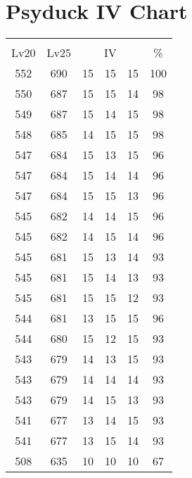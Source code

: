 \documentclass{article}%
\begin{document}
%
\normalsize%
\section{Psyduck IV Chart}%
\label{sec:Psyduck IV Chart}%
\renewcommand{\arraystretch}{1.5}%
\begin{tabular}{|c|c|c|c|c|c|}%
\hline%
\multicolumn{6}{|c|}{\textcolor{white}{ 
\linebreak{Psyduck}
}%
\cellcolor{black}}\\%
\multicolumn{1}{|c}{Lv20}&\multicolumn{1}{c|}{Lv25}&\multicolumn{3}{c|}{IV}&\multicolumn{1}{|c|}{\%}\\%
\hline%
\rowcolor{color100}%
552&690&15&15&15&100\\%
\hline%
\rowcolor{color98}%
550&687&15&15&14&98\\%
\hline%
\rowcolor{color98}%
549&687&15&14&15&98\\%
\hline%
\rowcolor{color98}%
548&685&14&15&15&98\\%
\hline%
\rowcolor{color96}%
547&684&15&13&15&96\\%
\hline%
\rowcolor{color96}%
547&684&15&14&14&96\\%
\hline%
\rowcolor{color96}%
547&684&15&15&13&96\\%
\hline%
\rowcolor{color96}%
545&682&14&14&15&96\\%
\hline%
\rowcolor{color96}%
545&682&14&15&14&96\\%
\hline%
\rowcolor{color93}%
545&681&15&13&14&93\\%
\hline%
\rowcolor{color93}%
545&681&15&14&13&93\\%
\hline%
\rowcolor{color93}%
545&681&15&15&12&93\\%
\hline%
\rowcolor{color96}%
544&681&13&15&15&96\\%
\hline%
\rowcolor{color93}%
544&680&15&12&15&93\\%
\hline%
\rowcolor{color93}%
543&679&14&13&15&93\\%
\hline%
\rowcolor{color93}%
543&679&14&14&14&93\\%
\hline%
\rowcolor{color93}%
543&679&14&15&13&93\\%
\hline%
\rowcolor{color93}%
541&677&13&14&15&93\\%
\hline%
\rowcolor{color93}%
541&677&13&15&14&93\\%
\hline%
\rowcolor{color91}%
508&635&10&10&10&67\\%
\end{tabular}

%
\end{document}
